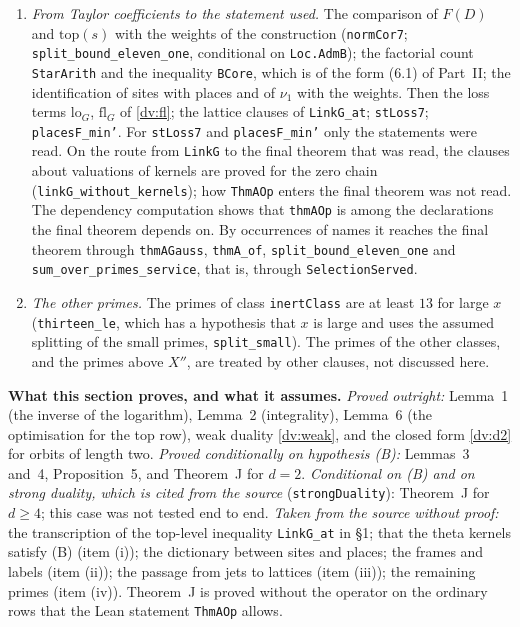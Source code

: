 \documentclass[11pt,letterpaper]{article}
\begin{document}
\begin{enumerate}[label=\textup{(\roman*)},leftmargin=2.4em]
imported by \texttt{Loc4ResOfLine} and \texttt{LiftSubstStart}, in the directory \texttt{CoarseMultiplicity},
which were not read.
\item \emph{From Taylor coefficients to the statement used.} The comparison of $F(D)$ and $\mathrm{top}(s)$
with the weights of the construction (\texttt{normCor7}; \texttt{split\_bound\_eleven\_one}, conditional on
\texttt{Loc.AdmB}); the factorial count \texttt{StarArith} and the inequality \texttt{BCore}, which is of the form (6.1)
of Part~II; the identification of sites with places and of $\nu_1$ with the weights. Then the loss terms
$\mathrm{lo}_G$, $\mathrm{fl}_G$ of \eqref{dv:fl}; the lattice clauses of \texttt{LinkG\_at};
\texttt{stLoss7}; \texttt{placesF\_min'}. For \texttt{stLoss7} and \texttt{placesF\_min'} only the statements
were read. On the route from \texttt{LinkG} to the final theorem that was read, the clauses about
valuations of kernels are proved for the zero chain (\texttt{linkG\_without\_kernels}); how \texttt{ThmAOp}
enters the final theorem was not read. The dependency computation shows that \texttt{thmAOp} is among the
declarations the final theorem depends on. By occurrences of names it reaches the final theorem through \texttt{thmAGauss}, \texttt{thmA\_of},
\texttt{split\_bound\_eleven\_one} and \texttt{sum\_over\_primes\_service}, that is, through
\texttt{SelectionServed}.
\item \emph{The other primes.} The primes of class \texttt{inertClass} are at least $13$ for large $x$
(\texttt{thirteen\_le}, which has a hypothesis that $x$ is large and uses the assumed splitting of the
small primes, \texttt{split\_small}). The primes of the
other classes, and the primes above $X''$, are treated by other clauses, not discussed here.
\end{enumerate}

\textbf{What this section proves, and what it assumes.} \emph{Proved outright:} Lemma~1 (the inverse
of the logarithm), Lemma~2 (integrality), Lemma~6 (the optimisation for the top row), weak duality
\eqref{dv:weak}, and the closed form \eqref{dv:d2} for orbits of length two. \emph{Proved conditionally on
hypothesis \textup{(B)}:} Lemmas~3 and~4, Proposition~5, and Theorem~J for $d=2$. \emph{Conditional on
\textup{(B)} and on strong duality, which is cited from the source} (\texttt{strongDuality}): Theorem~J for
$d\ge4$; this case was not tested end to end. \emph{Taken from the source without proof:} the transcription
of the top-level inequality \texttt{LinkG\_at} in \S1; that the theta kernels satisfy (B) (item (i)); the
dictionary between sites and places; the frames and labels (item (ii)); the passage from jets to lattices
(item (iii)); the remaining primes (item (iv)). Theorem~J is proved without the operator on the ordinary
rows that the Lean statement \texttt{ThmAOp} allows.
\end{document}
